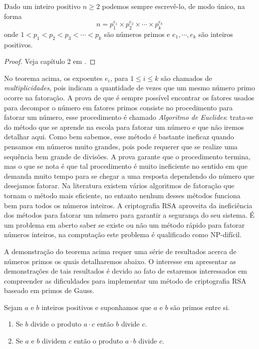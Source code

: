 \begin{Th}
\label{fat.unica} 
Dado um inteiro positivo $n\geq 2$ podemos sempre escrev\^e-lo, de modo \'unico, na forma
$$n=p_{1}^{e_1}\times p_{2}^{e_2}\times\cdots\times p_{k}^{e_k}$$
onde $1<p_1<p_2<p_3<\cdots<p_k$ s\~ao n\'umeros primos e $e_1, \cdots, e_k$ s\~ao inteiros positivos.
\end{Th}
\begin{proof}
	Veja cap\'{i}tulo 2 em \cite{cou:2014}.
\end{proof}

No teorema acima, os expoentes $e_i$, para $1\leq i\leq k$ s\~ao chamados de \textit{multiplicidades}, pois indicam a quantidade de vezes que um mesmo n\'umero primo ocorre na fatora\c{c}\~ao. A prova de que \'e sempre poss\'ivel encontrar os fatores usados para decompor o n\'umero em fatores primos consiste no procedimento para fatorar um n\'umero, esse procedimento \'e chamado \textit{Algoritmo de Euclides}: trata-se do m\'etodo que se aprende na escola para fatorar
um n\'umero e que n\~ao iremos detalhar aqui. Como bem sabemos, esse m\'etodo \'e bastante ineficaz quando pensamos em n\'umeros muito grandes, pois pode requerer que se realize uma sequ\^encia bem grande de divis\~oes. A prova garante que o procedimento termina, mas o que se nota \'e que tal procedimento \'e muito ineficiente no sentido em que demanda muito tempo para se chegar a uma resposta dependendo do n\'umero que desejamos fatorar. Na literatura existem v\'arios algoritmos de fatora\c{c}\~ao que tornam o m\'etodo mais eficiente, no entanto nenhum desses m\'etodos funciona bem para todos os n\'umeros inteiros. A criptografia RSA aproveita da inefici\^encia dos m\'etodos para fatorar um n\'umero para garantir a seguran\c{c}a do seu sistema. \'E um problema em aberto saber se existe ou n\~ao um m\'etodo r\'apido para fatorar n\'umeros inteiros, na computa\c{c}\~ao este problema \'e qualificado como NP-dif\'icil.  

A demonstra\c{c}\~ao do teorema acima requer uma s\'erie de resultados acerca de n\'umeros primos os quais detalharemos abaixo. O interesse em apresentar as demonstra\c{c}\~oes de tais resultados \'e devido ao fato de estaremos interessados em
compreender as dificuldades para implementar um m\'etodo de criptografia RSA baseado em primos de Gauss. 

\begin{Th}\label{propriedade_de_primos}
Sejam $a$ e $b$ inteiros positivos e suponhamos que $a$ e $b$ s\~ao primos entre si.
\begin{enumerate}
\item Se $b$ divide o produto $a\cdot c$ ent\~ao $b$ divide $c$.
\item Se $a$ e $b$ dividem $c$ ent\~ao o produto $a\cdot b$ divide $c$.
\end{enumerate}
\end{Th}

